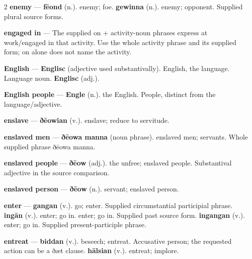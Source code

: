 \begin{multicols}{2}
\textbf{enemy} — \textbf{fēond} (n.). enemy; foe. \textbf{gewinna} (n.). enemy; opponent. Supplied plural source forms.\par
\textbf{engaged in} — The supplied on + activity-noun phrases express at work/engaged in that activity. Use the whole activity phrase and its supplied form; on alone does not name the activity.\par
\textbf{English} — \textbf{Englisc} (adjective used substantivally). English, the language. Language noun. \textbf{Englisc} (adj.).\par
\textbf{English people} — \textbf{Engle} (n.). the English. People, distinct from the language/adjective.\par
\textbf{enslave} — \textbf{ðēowian} (v.). enslave; reduce to servitude.\par
\textbf{enslaved men} — \textbf{ðēowa manna} (noun phrase). enslaved men; servants. Whole supplied phrase ðēowa manna.\par
\textbf{enslaved people} — \textbf{ðēow} (adj.). the unfree; enslaved people. Substantival adjective in the source comparison.\par
\textbf{enslaved person} — \textbf{ðēow} (n.). servant; enslaved person.\par
\textbf{enter} — \textbf{gangan} (v.). go; enter. Supplied circumstantial participial phrase. \textbf{ingān} (v.). enter; go in. enter; go in. Supplied past source form. \textbf{ingangan} (v.). enter; go in. Supplied present-participle phrase.\par
\textbf{entreat} — \textbf{biddan} (v.). beseech; entreat. Accusative person; the requested action can be a ðæt clause. \textbf{hālsian} (v.). entreat; implore.\par

\end{multicols}
